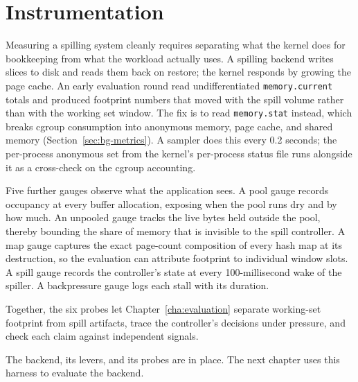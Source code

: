 \section{Instrumentation\label{sec:instrumentation}}

Measuring a spilling system cleanly requires separating what the kernel does for bookkeeping from what the workload actually uses.
A spilling backend writes slices to disk and reads them back on restore; the kernel responds by growing the page cache.
An early evaluation round read undifferentiated \texttt{memory.current} totals and produced footprint numbers that moved with the spill volume rather than with the working set window.
The fix is to read \texttt{memory.stat} instead, which breaks cgroup consumption into anonymous memory, page cache, and shared memory (Section~\ref{sec:bg-metrics}).
A sampler does this every 0.2 seconds; the per-process anonymous set from the kernel's per-process status file runs alongside it as a cross-check on the cgroup accounting.

Five further gauges observe what the application sees.
A pool gauge records occupancy at every buffer allocation, exposing when the pool runs dry and by how much.
An unpooled gauge tracks the live bytes held outside the pool, thereby bounding the share of memory that is invisible to the spill controller.
A map gauge captures the exact page-count composition of every hash map at its destruction, so the evaluation can attribute footprint to individual window slots.
A spill gauge records the controller's state at every 100-millisecond wake of the spiller.
A backpressure gauge logs each stall with its duration.

Together, the six probes let Chapter~\ref{cha:evaluation} separate working-set footprint from spill artifacts, trace the controller's decisions under pressure, and check each claim against independent signals.

The backend, its levers, and its probes are in place.
The next chapter uses this harness to evaluate the backend.
